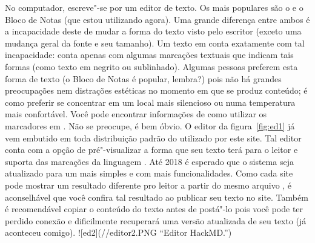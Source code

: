 {}\markdownRendererInterblockSeparator
{}No computador, escreve"-se por um editor de texto. Os mais populares são o  e o Bloco de Notas (que estou utilizando agora). Uma grande diferença entre ambos é a incapacidade deste de mudar a forma do texto visto pelo escritor (exceto uma mudança geral da fonte e seu tamanho). Um texto em  conta exatamente com tal incapacidade: conta apenas com algumas marcações textuais que indicam tais formas (como texto em negrito ou sublinhado). Algumas pessoas preferem esta forma de texto (o Bloco de Notas é popular, lembra?) pois não há grandes preocupações nem distrações estéticas no momento em que se produz conteúdo; é como preferir se concentrar em um local mais silencioso ou numa temperatura mais confortável. Você pode encontrar informações de como utilizar os marcadores em  . Não se preocupe, é bem óbvio.\markdownRendererInterblockSeparator
{}\markdownRendererInterblockSeparator
{}O editor da figura~\ref{fig:ed1} já vem embutido em toda distribuição padrão do  utilizado por este site. Tal editor conta com a opção de pré"-visualizar a forma que seu texto terá para o leitor e suporta  das marcações da linguagem . Até 2018 é esperado que o sistema seja atualizado para um mais simples e com mais funcionalidades. Como cada site pode mostrar um resultado diferente pro leitor a partir do mesmo arquivo , é aconselhável que você confira tal resultado ao publicar seu texto no site. Também é recomendável copiar o conteúdo do texto antes de postá"-lo pois você pode ter perdido conexão e dificilmente recuperará uma versão atualizada de seu texto (já aconteceu comigo).\markdownRendererInterblockSeparator
{}![ed2](\fontes/\caminho/editor2.PNG \textquotedblleft Editor HackMD.\textquotedblright{})\markdownRendererInterblockSeparator
